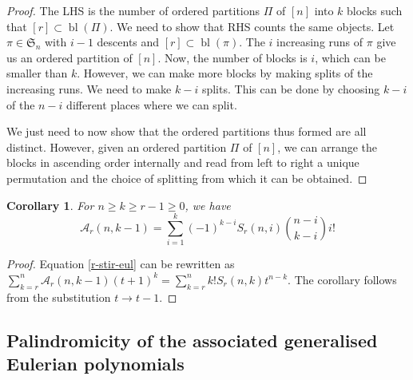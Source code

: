 \documentclass{article}
\newcommand{\dd}{\mathcal{D}}
\newcommand{\SSS}{\mathfrak{S}}
\newcommand{\eul}{\mathcal{A}}
\DeclareMathOperator{\bl}{bl}
\newtheorem{proposition}[theorem]{Proposition}
\newtheorem{corollary}[theorem]{Corollary}
\theoremstyle{definition}
\numberwithin{equation}{section}
\begin{document}
\begin{proof}
    The LHS is the number of ordered partitions $\Pi$ of $[n]$ into $k$ blocks such that $[r] \subset \bl(\Pi)$. We need to show that RHS counts the same objects. Let $\pi\in \SSS_n$ with $i-1$ descents and $[r]\subset \bl(\pi)$. The $i$ increasing runs of $\pi$ give us an ordered partition of $[n]$. Now, the number of blocks is $i$, which can be smaller than $k$. However, we can make more blocks by making splits of the increasing runs. We need to make $k-i$ splits. This can be done by choosing $k-i$ of the $n-i$ different places where we can split.

    We just need to now show that the ordered partitions thus formed are all distinct. However, given an ordered partition $\Pi$ of $[n]$, we can arrange the blocks in ascending order internally and read from left to right a unique permutation and the choice of splitting from which it can be obtained.
\end{proof}

\begin{corollary} For $n\ge k\ge r-1\ge 0$, we have
    \begin{equation}
        \eul_r(n,k-1)=\sum_{i=1}^{k}(-1)^{k-i}S_r(n,i)\binom{n-i}{k-i}i!
    \end{equation}
\end{corollary}
\begin{proof}
    Equation \ref{r-stir-eul} can be rewritten as $\sum_{k=r}^n\eul_r(n,k-1)(t+1)^k=\sum_{k=r}^nk!S_r(n,k)t^{n-k}$.
    The corollary follows from the substitution $t\rightarrow t-1$.
\end{proof}
\subsection{Palindromicity of the associated generalised Eulerian polynomials}


    
\end{document}
